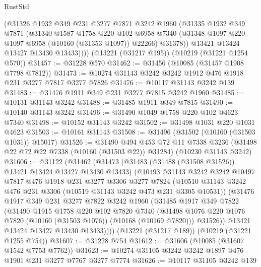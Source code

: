 \begin{lexlean}{RustStd}
\begin{coremodule}
          (@31326
            @1932
            @349
            @231
            @3277
            @7871
            @3242
            @1960
            (@31335
              @1932
              @349
              @7871
              (@31340
                @1587
                @1758
                @220
                @102
                @6958
                @7340
                (@31348 @1097 @220 @1097 @6958 (@10160 (@31353 @1097)) @22266)
                @31378))
            @13421
            @13424
            @13427
            @13430
            @13433))))
    (@13221 (@31217 @195))
    (@10219 (@31221 @1254 @570))
@31457 := @31228 @570
@31462 := @31456 (@10085 (@31457 @1908 @7798 @7812))
@31473 := @10274 @31143 @3242 @3242 @1912 @476 @1918 @231 @3277 @7817 @3277 @7826
@31476 := @10117 @31143 @3242 @139
@31483 := @31476 @1911 @349 @231 @3277 @7815 @3242 @1960
@31485 := @10131 @31143 @3242
@31488 := @31485 @1911 @349 @7815
@31490 := @10140 @31143 @3242
@31496 := @31490 @1049 @1758 @220 @102 @4623 @7340
@31498 := @10152 @31143 @3242
@31502 := @31498 @1031 @220 @1031 @4623
@31503 := @10161 @31143
@31508 := @31496 (@31502 (@10160 (@31503 @1031)) @15017)
@31526 := @31490
    @494
    @453
    @72
    @11
    @7338
    @3236
    (@31498 @22 @72 @22 @7338 (@10160 (@31503 @22)) @31284)
    (@10230 @31143 @3242)
@31606 := @31122
    (@31462
      (@31473
        (@31483 (@31488 (@31508 @31526)) @13421 @13424 @13427 @13430 @13433)
        (@10493
          @31143
          @3242
          @3242
          @10497
          @7817
          @476
          @1918
          @231
          @3277
          @3306
          @3277
          @7824
          (@10510 @31143 @3242 @476 @231 @3306 (@10519 @31143 @3242 @473 @231 @3305 @10531))
          (@31476
            @1917
            @349
            @231
            @3277
            @7822
            @3242
            @1960
            (@31485
              @1917
              @349
              @7822
              (@31490
                @1915
                @1758
                @220
                @102
                @7820
                @7340
                (@31498 @1076 @220 @1076 @7820 (@10160 (@31503 @1076)) (@10168 (@10169 @7820)))
                @31526))
            @13421
            @13424
            @13427
            @13430
            @13433))))
    (@13221 (@31217 @189))
    (@10219 (@31221 @1255 @754))
@31607 := @31228 @754
@31612 := @31606 (@10085 (@31607 @1542 @7753 @7762))
@31623 := @10274 @31105 @3242 @3242 @1897 @476 @1901 @231 @3277 @7767 @3277 @7774
@31626 := @10117 @31105 @3242 @139

\end{coremodule}
\end{lexlean}
